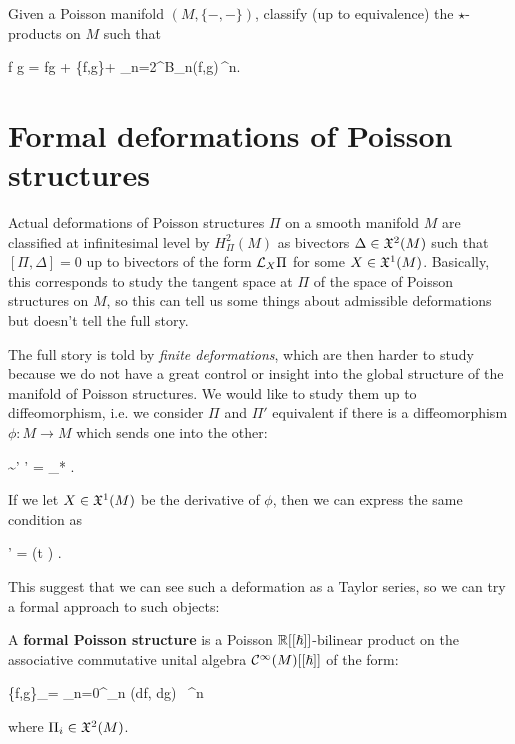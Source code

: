 \begin{problem*}
	Given a Poisson manifold $(M, \{-,-\})$, classify (up to equivalence) the $\star$-products on $M$ such that
	\begin{eqalign}
		f \star g = fg + \{f,g\}\planck + \sum_{n=2}^\infty B_n(f,g)\,\planck^n.
	\end{eqalign}
\end{problem*}

\section{Formal deformations of Poisson structures}
Actual deformations of Poisson structures $\Pi$ on a smooth manifold $M$ are classified at infinitesimal level by $H^2_\Pi(M)$ as bivectors $\Delta \in \mathfrak{X}^2(M)$ such that $[\Pi,\Delta]=0$ up to bivectors of the form $\mathcal{L}_{X} \Pi$ for some $X \in \mathfrak{X}^1(M)$. Basically, this corresponds to study the tangent space at $\Pi$ of the space of Poisson structures on $M$, so this can tell us some things about admissible deformations but doesn't tell the full story.

The full story is told by \emph{\issue finite deformations}, which are then harder to study because we do not have a great control or insight into the global structure of the manifold of Poisson structures. We would like to study them up to diffeomorphism, i.e. we consider $\Pi$ and $\Pi'$ equivalent if there is a diffeomorphism $\phi : M \to M$ which sends one into the other:
\begin{eqalign}
	\Pi \sim \Pi' \iff \Pi' = \phi_* \Pi.
\end{eqalign}
If we let $X \in \mathfrak{X}^1(M)$ be the derivative of $\phi$, then we can express the same condition as
\begin{eqalign}
	\Pi' = \exp(t ) \Pi.
\end{eqalign}
This suggest that we can see such a deformation as a Taylor series, so we can try a formal approach to such objects:

\begin{definition}
	A \textbf{formal Poisson structure} is a Poisson $\mathbb{R}[[{\boldsymbol\hslash}]]$-bilinear product on the associative commutative unital algebra $\mathcal{C}^\infty(M)[[{\boldsymbol\hslash}]]$ of the form:
	\begin{eqalign}
		\{f,g\}_\planck = \sum_{n=0}^\infty \Pi_n (df, dg) \, \planck^n
	\end{eqalign}
	where $\Pi_i \in \mathfrak{X}^2(M)$.
\end{definition}

